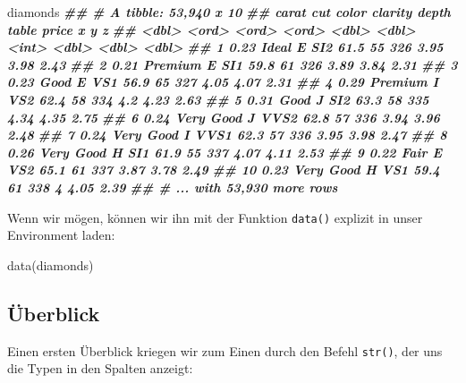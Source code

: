\documentclass[
  ngerman,
]{article}
\newenvironment{Shaded}{\begin{snugshade}}{\end{snugshade}}
\newcommand{\DocumentationTok}[1]{\textcolor[rgb]{0.56,0.35,0.01}{\textbf{\textit{#1}}}}
\newcommand{\FunctionTok}[1]{\textcolor[rgb]{0.00,0.00,0.00}{#1}}
\newcommand{\NormalTok}[1]{#1}
\begin{document}
\begin{Shaded}
\begin{Highlighting}[]
\NormalTok{diamonds}
\DocumentationTok{\#\# \# A tibble: 53,940 x 10}
\DocumentationTok{\#\#    carat cut       color clarity depth table price     x     y     z}
\DocumentationTok{\#\#    \textless{}dbl\textgreater{} \textless{}ord\textgreater{}     \textless{}ord\textgreater{} \textless{}ord\textgreater{}   \textless{}dbl\textgreater{} \textless{}dbl\textgreater{} \textless{}int\textgreater{} \textless{}dbl\textgreater{} \textless{}dbl\textgreater{} \textless{}dbl\textgreater{}}
\DocumentationTok{\#\#  1  0.23 Ideal     E     SI2      61.5    55   326  3.95  3.98  2.43}
\DocumentationTok{\#\#  2  0.21 Premium   E     SI1      59.8    61   326  3.89  3.84  2.31}
\DocumentationTok{\#\#  3  0.23 Good      E     VS1      56.9    65   327  4.05  4.07  2.31}
\DocumentationTok{\#\#  4  0.29 Premium   I     VS2      62.4    58   334  4.2   4.23  2.63}
\DocumentationTok{\#\#  5  0.31 Good      J     SI2      63.3    58   335  4.34  4.35  2.75}
\DocumentationTok{\#\#  6  0.24 Very Good J     VVS2     62.8    57   336  3.94  3.96  2.48}
\DocumentationTok{\#\#  7  0.24 Very Good I     VVS1     62.3    57   336  3.95  3.98  2.47}
\DocumentationTok{\#\#  8  0.26 Very Good H     SI1      61.9    55   337  4.07  4.11  2.53}
\DocumentationTok{\#\#  9  0.22 Fair      E     VS2      65.1    61   337  3.87  3.78  2.49}
\DocumentationTok{\#\# 10  0.23 Very Good H     VS1      59.4    61   338  4     4.05  2.39}
\DocumentationTok{\#\# \# ... with 53,930 more rows}
\end{Highlighting}
\end{Shaded}

Wenn wir mögen, können wir ihn mit der Funktion \texttt{data()} explizit in unser Environment laden:

\begin{Shaded}
\begin{Highlighting}[]
\FunctionTok{data}\NormalTok{(diamonds)}
\end{Highlighting}
\end{Shaded}

\hypertarget{uxfcberblick}{%
\subsection{Überblick}\label{uxfcberblick}}

Einen ersten Überblick kriegen wir zum Einen durch den Befehl \texttt{str()}, der uns die Typen in den Spalten anzeigt:
\end{document}

